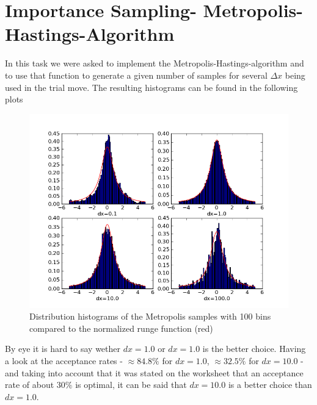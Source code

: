 \documentclass[12pt,a4paper]{scrartcl}
\begin{document}
\section{Importance Sampling- Metropolis-Hastings-Algorithm}
In this task we were asked to implement the Metropolis-Hastings-algorithm and to use that function to generate a given number of samples for several $\Delta x$ being used in the trial move.
The resulting histograms can be found in the following plots
 \begin{figure}[H]
\centering
\includegraphics[width=16.0cm]{../plots/hist.png}
\caption{Distribution histograms of the Metropolis samples with 100 bins compared to the normalized runge function (red)}
\label{fig:runge}
\end{figure}
By eye it is hard to say wether $dx = 1.0$ or $dx= 1.0$ is the better choice. Having a look at the acceptance rates - $\approx 84.8\%$ for $ dx=1.0$, $\approx 32.5\%$ for $dx=10.0$  -and taking into account that it was stated on the worksheet that an acceptance rate of about $30\%$ is optimal, it can be said that $dx = 10.0 $ is a better choice than $dx= 1.0$.
\end{document}

